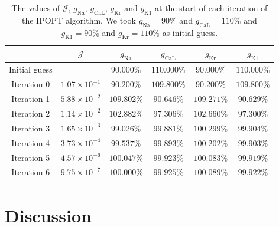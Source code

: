 \documentclass{article}
\begin{document}
\begin{table}
\begin{center}
  \begin{tabular}{c || c c c c c }
    &  $\mathcal{J}$ & $g_{\mathrm{Na}}$ & $g_{\mathrm{CaL}}$ & $g_{\mathrm{Kr}}$ & $g_{\mathrm{K1}}$ \\ 
\hline
Initial guess & 
&   $90.000 \%$ & $110.000 \%$ &   $90.000 \%$ & $110.000 \%$  \\
Iteration 0   & $1.07 \times 10^{-1}$  &   $90.200 \%$ & $109.800 \%$ &   $90.200 \%$ & $109.800 \%$  \\
Iteration 1   & $5.88 \times 10^{-2}$  &   $109.802 \%$ & $90.646 \%$ &   $109.271 \%$ & $90.629 \%$  \\
Iteration 2   & $1.14 \times 10^{-2}$  &   $102.882 \%$ & $97.306 \%$ &   $102.660 \%$ & $97.300 \%$  \\
Iteration 3   & $1.65 \times 10^{-3}$  &   $99.026 \%$ & $99.881 \%$ &   $100.299 \%$ & $99.904 \%$  \\
Iteration 4   & $3.73 \times 10^{-4}$  &   $99.537 \%$ & $99.893 \%$ &   $100.202 \%$ & $99.903 \%$  \\
Iteration 5   & $4.57 \times 10^{-6}$  &   $100.047 \%$ & $99.923 \%$ &   $100.083 \%$ & $99.919 \%$  \\
Iteration 6   & $9.75 \times 10^{-7}$  &   $100.000 \%$ & $99.925 \%$ &   $100.089 \%$ & $99.922 \%$  \\
  \end{tabular}  %
\end{center}
\caption{The values of $\mathcal{J}$, $g_{\mathrm{Na}}$, $g_{\mathrm{CaL}}$, $g_{\mathrm{Kr}}$ and $g_{\mathrm{K1}}$ at the start of each iteration of the IPOPT algorithm. We took $g_{\mathrm{Na}}=90\%$ and $g_{\mathrm{CaL}}=110\%$ and $g_{\mathrm{K1}}=90\%$ and $g_{\mathrm{Kr}}=110\%$ as initial guess.}
\label{table:2}
\end{table}
\section{Discussion} \label{Discussion}
\end{document}
